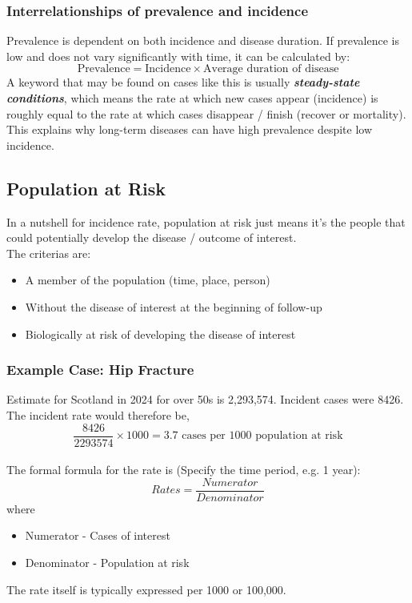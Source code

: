 \documentclass{article}
\begin{document}
\subsubsection*{Interrelationships of prevalence and incidence}
Prevalence is dependent on both incidence and disease duration. If prevalence is low and does not vary significantly with time, it can be calculated by:
\begin{equation*}
    \text{Prevalence} = \text{Incidence} \times \text{Average duration of disease}
\end{equation*}
A keyword that may be found on cases like this is usually \textit{\textbf{steady-state conditions}}, which means the rate at which new cases appear (incidence) is roughly equal to the rate at which cases disappear / finish (recover or mortality). This explains why long-term diseases can have high prevalence despite low
incidence.

\subsection{Population at Risk}
In a nutshell for incidence rate, population at risk just means it's the people that could potentially develop the disease / outcome of interest.
\\
The criterias are:
\begin{itemize}
    \item A member of the population (time, place, person)
    \item Without the disease of interest at the beginning of follow-up
    \item Biologically at risk of developing the disease of interest
\end{itemize}

\subsubsection*{Example Case: Hip Fracture}
Estimate for Scotland in 2024 for over 50s is 2,293,574. Incident cases were 8426. The incident rate would therefore be,
\begin{equation}
    \frac{8426}{2293574} \times 1000 = 3.7 \text{ cases per 1000 population at risk}
\end{equation}
\\
The formal formula for the rate is (Specify the time period, e.g. 1 year):
\begin{equation}
    Rates = \frac{Numerator}{Denominator}
\end{equation}
where
\begin{itemize}
    \item Numerator - Cases of interest
    \item Denominator - Population at risk
\end{itemize}
The rate itself is typically expressed per 1000 or 100,000.
\\
\end{document}
